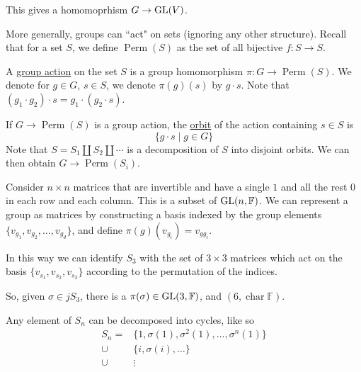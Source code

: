 \documentclass[x11names,reqno,14pt]{extarticle}
\begin{document}
This gives a homomoprhism $G\to {\mathrm{GL}}(V)$. 

More generally, groups can ``act" on sets (ignoring any other structure). Recall that for a set $S$, we define $\operatorname{Perm}(S)$ as the set of all bijective $f:S\to S$. 


A \underline{group action} on the set $S$ is a group homomorphism $\pi:G\to\operatorname{Perm}(S)$. We denote for $g \in G$, $s \in S$, we denote $\pi(g)(s)$ by $g\cdot s$. Note that $(g_1\cdot g_2)\cdot s = g_1 \cdot (g_2 \cdot s)$. 


If $G\to\operatorname{Perm}(S)$ is a group action, the \underline{orbit} of the action containing $s \in S$ is 
\[
\{g\cdot s \mid g \in G\}
\]
Note that $S = S_1\coprod S_2 \coprod \cdots$ is a decomposition of $S$ into disjoint orbits. We can then obtain $G\to \operatorname{Perm}(S_i)$. 

Consider $n\times n$ matrices that are invertible and have a single $1$ and all the rest $0$ in each row and each column. This is a subset of ${\mathrm{GL}}(n, \mathbb{F})$. We can represent a group as matrices by constructing a basis indexed by the group elements $\{v_{g_1}, v_{g_2}, \dots, v_{g_d}\}$, and define $\pi(g)(v_{g_i}) = v_{gg_i}$. 

In this way we can identify $S_3$ with the set of $3\times 3$ matrices which act on the basis $\{v_{s_1}, v_{s_2}, v_{s_3}\}$ according to the permutation of the indices. 

So, given $\sigma \in jS_3$, there is a $\pi(\sigma)\in {\mathrm{GL}}(3, \mathbb{F})$, and $(6, \operatorname{char}\mathbb{F})$. 

Any element of $S_n$ can be decomposed into cycles, like so
\begin{align*}
S_n = & \{1, \sigma(1), \sigma^2(1), \dots, \sigma^n(1) \} \\
	\cup	& \{i, \sigma(i), \dots \} \\
	\cup	& \vdots \\
\end{align*}
\end{document}
